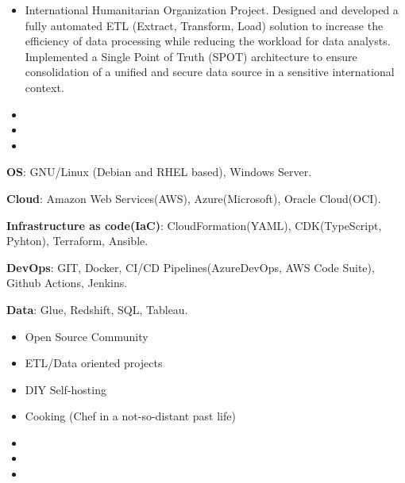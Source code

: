\begin{itemize}
\item International Humanitarian Organization Project. Designed and developed a fully automated ETL (Extract, Transform, Load) solution to increase the efficiency of data processing while reducing the workload for data analysts. Implemented a Single Point of Truth (SPOT) architecture to ensure consolidation of a unified and secure data source in a sensitive international context.
\end{itemize}
\smallskip
\smallskip

\begin{itemize}
 \item {}
 \item {}
 \item {}
\end{itemize}
\smallskip
\begin{description}
 \item \textbf{OS}: GNU/Linux (Debian and RHEL based), Windows Server.
 \item \textbf{Cloud}: Amazon Web Services(AWS), Azure(Microsoft), Oracle Cloud(OCI).
 \item \textbf{Infrastructure as code(IaC)}: CloudFormation(YAML), CDK(TypeScript, Pyhton), Terraform, Ansible.
 \item \textbf{DevOps}: GIT, Docker, CI/CD Pipelines(AzureDevOps, AWS Code Suite), Github Actions, Jenkins.
 \item \textbf{Data}: Glue, Redshift, SQL, Tableau.
\end{description}

\begin{itemize}
\item Open Source Community
\item ETL/Data oriented projects
\end{itemize}
\smallskip
{}
\begin{itemize}
\item DIY Self-hosting
\item Cooking (Chef in a not-so-distant past life)
\end{itemize}


\begin{itemize}
 \item {}
 \item {}
 \item {}
\end{itemize}

